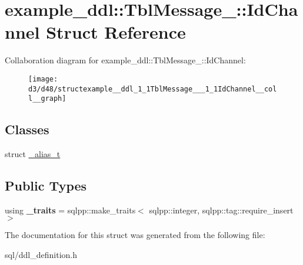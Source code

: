 \hypertarget{structexample__ddl_1_1TblMessage___1_1IdChannel}{}\section{example\+\_\+ddl\+:\+:Tbl\+Message\+\_\+\+:\+:Id\+Channel Struct Reference}
\label{structexample__ddl_1_1TblMessage___1_1IdChannel}


Collaboration diagram for example\+\_\+ddl\+:\+:Tbl\+Message\+\_\+\+:\+:Id\+Channel\+:
\nopagebreak
\begin{figure}[H]
\begin{center}
\leavevmode
\texttt{[image: d3/d48/structexample\_\_ddl\_1\_1TblMessage\_\_\_1\_1IdChannel\_\_coll\_\_graph]}
\end{center}
\end{figure}
\subsection*{Classes}
\begin{DoxyCompactItemize}
\item 
struct \hyperlink{structexample__ddl_1_1TblMessage___1_1IdChannel_1_1__alias__t}{\+\_\+alias\+\_\+t}
\end{DoxyCompactItemize}
\subsection*{Public Types}
\begin{DoxyCompactItemize}
\item 
\hypertarget{structexample__ddl_1_1TblMessage___1_1IdChannel_a4cd66063b03263f3b26462021865d408}{}using {\bfseries \+\_\+traits} = sqlpp\+::make\+\_\+traits$<$ sqlpp\+::integer, sqlpp\+::tag\+::require\+\_\+insert $>$\label{structexample__ddl_1_1TblMessage___1_1IdChannel_a4cd66063b03263f3b26462021865d408}

\end{DoxyCompactItemize}


The documentation for this struct was generated from the following file\+:\begin{DoxyCompactItemize}
\item 
sql/ddl\+\_\+definition.\+h\end{DoxyCompactItemize}
